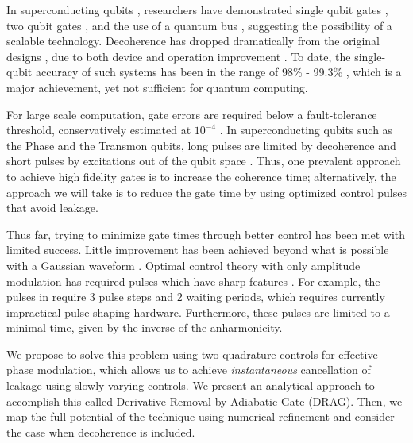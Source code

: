 \documentclass[prl,twocolumn,aps,final,floatfix,superscriptaddress,showpacs]{revtex4}
\begin{document}
 
 
In superconducting qubits \cite{Clarke:2008a}, researchers have demonstrated single qubit gates \cite{Lucero:2008a,Chow:2008a}, two qubit gates \cite{Yamamoto:2003b,Plantenberg:2007a}, and the use of a quantum bus \cite{Majer:2007a,Sillanpaa:2007a}, suggesting the possibility of a scalable technology. Decoherence has dropped dramatically \cite{Martinis:2005a,Houck:2008a,Bertet:2005a} from the original designs \cite{Nakamura:1999a}, due to both device and operation improvement \cite{Martinis:2005a,Koch:2007a,Vion:2002a}.  To date, the single-qubit accuracy of such systems has been in the range of 98\% \cite{Lucero:2008a}- 99.3\% \cite{Chow:2008a}, which is a major achievement, yet not sufficient for quantum computing.

For large scale computation, gate errors are required below a fault-tolerance threshold, conservatively estimated at $10^{-4}$ \cite{Knill:2005a}. In superconducting qubits such as the Phase \cite{Martinis:2002a,Martinis:2005a,Lucero:2008a} and the Transmon \cite{Koch:2007a,Schreier:2008a,Houck:2008a,Chow:2008a} qubits, long pulses are limited by decoherence and short pulses by excitations out of the qubit space \cite{Chow:2008a,Steffen:2003a}. Thus, one prevalent approach to achieve high fidelity gates is to increase the coherence time; alternatively, the approach we will take is to reduce the gate time by using optimized control pulses that avoid leakage.

Thus far, trying to minimize gate times through better control has been met with limited success. Little improvement has been achieved beyond what is possible with a Gaussian waveform \cite{Bauer:1984a,Steffen:2003a}. Optimal control theory with only amplitude modulation has required pulses which have sharp features \cite{Rebentrost:2008a,Safaei:2008a,Jirari:2005a}. For example, the pulses in \cite{Steffen:2003a,Rebentrost:2008a} require 3 pulse steps and 2 waiting periods, which requires currently impractical pulse shaping hardware.  Furthermore, these pulses are limited to a minimal time, given by the inverse of the anharmonicity. 

We propose to solve this problem using two quadrature controls for effective phase modulation, which allows us to achieve {\em instantaneous} cancellation of leakage using slowly varying controls.  We present an analytical approach to accomplish this called Derivative Removal by Adiabatic Gate (DRAG). Then, we map the full potential of the technique using numerical refinement and consider the case when decoherence is included.
\end{document}
